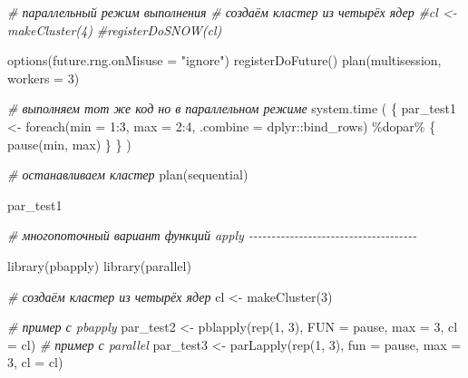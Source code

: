 \documentclass[
]{book}
\newenvironment{Shaded}{\begin{snugshade}}{\end{snugshade}}
\newcommand{\AttributeTok}[1]{\textcolor[rgb]{0.77,0.63,0.00}{#1}}
\newcommand{\CommentTok}[1]{\textcolor[rgb]{0.56,0.35,0.01}{\textit{#1}}}
\newcommand{\DecValTok}[1]{\textcolor[rgb]{0.00,0.00,0.81}{#1}}
\newcommand{\FunctionTok}[1]{\textcolor[rgb]{0.00,0.00,0.00}{#1}}
\newcommand{\NormalTok}[1]{#1}
\newcommand{\OtherTok}[1]{\textcolor[rgb]{0.56,0.35,0.01}{#1}}
\newcommand{\SpecialCharTok}[1]{\textcolor[rgb]{0.00,0.00,0.00}{#1}}
\newcommand{\StringTok}[1]{\textcolor[rgb]{0.31,0.60,0.02}{#1}}
\begin{document}
\begin{Shaded}
\begin{Highlighting}[]
\CommentTok{\# параллельный режим выполнения}
\CommentTok{\# создаём кластер из четырёх ядер}
\CommentTok{\#cl \textless{}{-} makeCluster(4)}
\CommentTok{\#registerDoSNOW(cl)}

\FunctionTok{options}\NormalTok{(}\AttributeTok{future.rng.onMisuse =} \StringTok{"ignore"}\NormalTok{)}
\FunctionTok{registerDoFuture}\NormalTok{()}
\FunctionTok{plan}\NormalTok{(}\StringTok{\textquotesingle{}multisession\textquotesingle{}}\NormalTok{, }\AttributeTok{workers =} \DecValTok{3}\NormalTok{)}

\CommentTok{\# выполняем тот же код но в параллельном режиме}
\FunctionTok{system.time}\NormalTok{ (}
\NormalTok{  \{}
\NormalTok{    par\_test1 }\OtherTok{\textless{}{-}} 
      \FunctionTok{foreach}\NormalTok{(}\AttributeTok{min =} \DecValTok{1}\SpecialCharTok{:}\DecValTok{3}\NormalTok{, }\AttributeTok{max =} \DecValTok{2}\SpecialCharTok{:}\DecValTok{4}\NormalTok{, }\AttributeTok{.combine =}\NormalTok{ dplyr}\SpecialCharTok{::}\NormalTok{bind\_rows) }\SpecialCharTok{\%dopar\%}\NormalTok{ \{}
      \FunctionTok{pause}\NormalTok{(min, max)}
\NormalTok{    \}}
\NormalTok{  \}}
\NormalTok{)}

\CommentTok{\# останавливаем кластер}
\FunctionTok{plan}\NormalTok{(}\StringTok{\textquotesingle{}sequential\textquotesingle{}}\NormalTok{)}

\NormalTok{par\_test1}


\CommentTok{\# многопоточный вариант функций apply {-}{-}{-}{-}{-}{-}{-}{-}{-}{-}{-}{-}{-}{-}{-}{-}{-}{-}{-}{-}{-}{-}{-}{-}{-}{-}{-}{-}{-}{-}{-}{-}{-}{-}{-}{-}{-}}

\FunctionTok{library}\NormalTok{(pbapply)}
\FunctionTok{library}\NormalTok{(parallel)}

\CommentTok{\# создаём кластер из четырёх ядер}
\NormalTok{cl }\OtherTok{\textless{}{-}} \FunctionTok{makeCluster}\NormalTok{(}\DecValTok{3}\NormalTok{)}

\CommentTok{\# пример с pbapply}
\NormalTok{par\_test2 }\OtherTok{\textless{}{-}} \FunctionTok{pblapply}\NormalTok{(}\FunctionTok{rep}\NormalTok{(}\DecValTok{1}\NormalTok{, }\DecValTok{3}\NormalTok{), }\AttributeTok{FUN =}\NormalTok{ pause, }\AttributeTok{max =} \DecValTok{3}\NormalTok{, }\AttributeTok{cl =}\NormalTok{ cl)}
\CommentTok{\# пример с parallel}
\NormalTok{par\_test3 }\OtherTok{\textless{}{-}} \FunctionTok{parLapply}\NormalTok{(}\FunctionTok{rep}\NormalTok{(}\DecValTok{1}\NormalTok{, }\DecValTok{3}\NormalTok{), }\AttributeTok{fun =}\NormalTok{ pause, }\AttributeTok{max =} \DecValTok{3}\NormalTok{, }\AttributeTok{cl =}\NormalTok{ cl)}


\end{Highlighting}
\end{Shaded}
\end{document}
